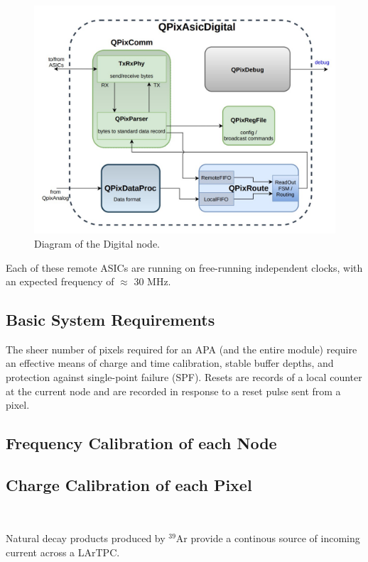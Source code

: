 \begin{figure}[]
\centering
\includegraphics[width=\textwidth]{images/digital_node_overview.jpg}
\caption{Diagram of the Digital node.}
\end{figure}

Each of these remote ASICs are running on free-running independent clocks, with an expected frequency of $\approx$ 30 MHz.

\subsection{Basic System Requirements}

The sheer number of pixels required for an APA (and the entire module) require an effective means of charge and time calibration, stable buffer depths, and protection against single-point failure (SPF).
Resets are records of a local counter at the current node and are recorded in response to a reset pulse sent from a pixel.

\subsection{Frequency Calibration of each Node}

\subsection{Charge Calibration of each Pixel}~\label{sec:charge_calibration}

Natural decay products produced by $^{39}$Ar provide a continous source of incoming current across a LArTPC.

